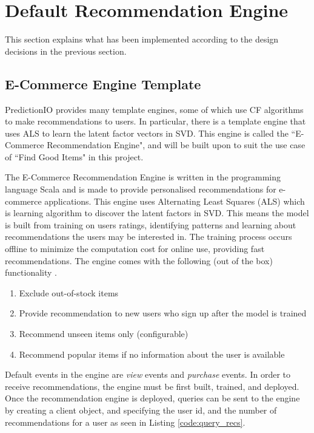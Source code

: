 \section{Default Recommendation Engine}

This section explains what has been implemented according to the design decisions in the previous section.

\subsection{E-Commerce Engine Template}

PredictionIO \cite{predictionio} provides many template engines, some of which use CF algorithms to make recommendations to users. In particular, there is a template engine that uses ALS to learn the latent factor vectors in SVD. This engine is called the ``E-Commerce Recommendation Engine", and will be built upon to suit the use case of ``Find Good Items" in this project. 

The E-Commerce Recommendation Engine \cite{predictonio} is written in the programming language Scala and is made to provide personalised recommendations for e-commerce applications. This engine uses Alternating Least Squares (ALS) which is learning algorithm to discover the latent factors in SVD. This means the model is built from training on users ratings, identifying patterns and learning about recommendations the users may be interested in. The training process occurs offline to minimize the computation cost for online use, providing fast recommendations. The engine comes with the following (out of the box) functionality \cite{predictionio}.
\begin{enumerate}
 \item Exclude out-of-stock items
 \item Provide recommendation to new users who sign up after the model is trained
 \item Recommend unseen items only (configurable)
 \item Recommend popular items if no information about the user is available
\end{enumerate}

Default events in the engine are \textit{view} events and \textit{purchase} events. In order to receive recommendations, the engine must be first built, trained, and deployed. Once the recommendation engine is deployed, queries can be sent to the engine by creating a client object, and specifying the user id, and the number of recommendations for a user as seen in Listing \ref{code:query_recs}.  

